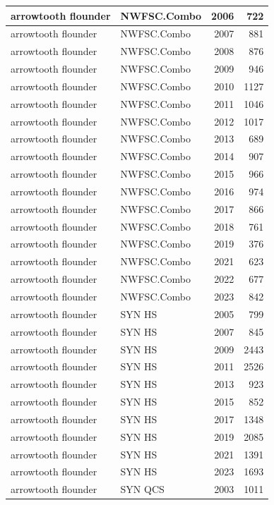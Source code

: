 \documentclass[
  letterpaper,
  DIV=11,
  numbers=noendperiod]{scrartcl}
\begin{document}
\begin{tabular}[t]{l|l|r|r}
\hline
arrowtooth flounder & NWFSC.Combo & 2006 & 722\\
\hline
arrowtooth flounder & NWFSC.Combo & 2007 & 881\\
\hline
arrowtooth flounder & NWFSC.Combo & 2008 & 876\\
\hline
arrowtooth flounder & NWFSC.Combo & 2009 & 946\\
\hline
arrowtooth flounder & NWFSC.Combo & 2010 & 1127\\
\hline
arrowtooth flounder & NWFSC.Combo & 2011 & 1046\\
\hline
arrowtooth flounder & NWFSC.Combo & 2012 & 1017\\
\hline
arrowtooth flounder & NWFSC.Combo & 2013 & 689\\
\hline
arrowtooth flounder & NWFSC.Combo & 2014 & 907\\
\hline
arrowtooth flounder & NWFSC.Combo & 2015 & 966\\
\hline
arrowtooth flounder & NWFSC.Combo & 2016 & 974\\
\hline
arrowtooth flounder & NWFSC.Combo & 2017 & 866\\
\hline
arrowtooth flounder & NWFSC.Combo & 2018 & 761\\
\hline
arrowtooth flounder & NWFSC.Combo & 2019 & 376\\
\hline
arrowtooth flounder & NWFSC.Combo & 2021 & 623\\
\hline
arrowtooth flounder & NWFSC.Combo & 2022 & 677\\
\hline
arrowtooth flounder & NWFSC.Combo & 2023 & 842\\
\hline
arrowtooth flounder & SYN HS & 2005 & 799\\
\hline
arrowtooth flounder & SYN HS & 2007 & 845\\
\hline
arrowtooth flounder & SYN HS & 2009 & 2443\\
\hline
arrowtooth flounder & SYN HS & 2011 & 2526\\
\hline
arrowtooth flounder & SYN HS & 2013 & 923\\
\hline
arrowtooth flounder & SYN HS & 2015 & 852\\
\hline
arrowtooth flounder & SYN HS & 2017 & 1348\\
\hline
arrowtooth flounder & SYN HS & 2019 & 2085\\
\hline
arrowtooth flounder & SYN HS & 2021 & 1391\\
\hline
arrowtooth flounder & SYN HS & 2023 & 1693\\
\hline
arrowtooth flounder & SYN QCS & 2003 & 1011\\

\end{tabular}
\end{document}
